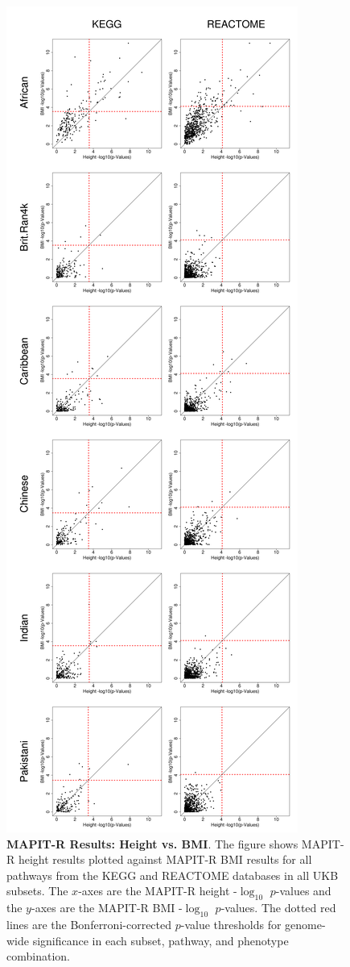 \documentclass[12pt, a4paper]{article}
\begin{document}
\setlength{\footskip}{3cm}
\begin{figure}[htbp]
\centering
\vspace*{-2cm}
\includegraphics[scale=.2]{Images/Supp/InterPath_Supp_Figure_MAPITR_PhenoComps_AllPops_vs2.png}
\caption[TBD]{\textbf{MAPIT-R Results: Height vs. BMI}. The figure shows MAPIT-R height results plotted against MAPIT-R BMI results for all pathways from the KEGG and REACTOME databases in all UKB subsets. The $x$-axes are the MAPIT-R height -$\log_{10}$ $p$-values and the $y$-axes are the MAPIT-R BMI -$\log_{10}$ $p$-values. The dotted red lines are the Bonferroni-corrected $p$-value thresholds for genome-wide significance in each subset, pathway, and phenotype combination.}
\label{InterPath-Supp-Figure-MAPITR-PhenoComps-AllPops}
\end{figure}
\clearpage
\setlength{\footskip}{1cm}
\end{document}
